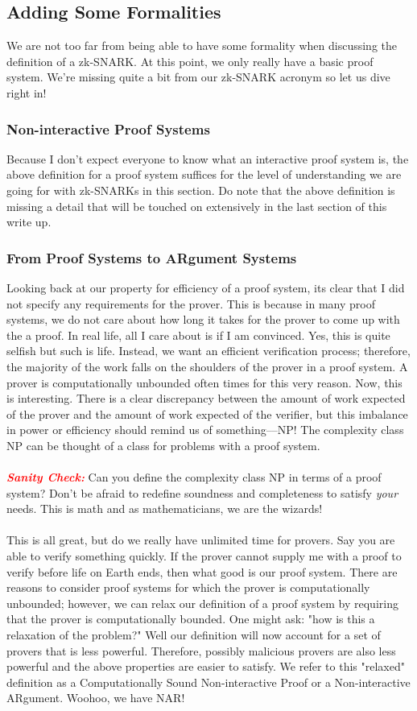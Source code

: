 \documentclass{article}
\begin{document}
\subsection{Adding Some Formalities}
We are not too far from being able to have some formality when discussing the definition of a zk-SNARK. At this point, we only really have a basic proof system. We're missing quite a bit from our zk-SNARK acronym so let us dive right in!
\subsubsection{Non-interactive Proof Systems}
Because I don't expect everyone to know what an interactive proof system is, the above definition for a proof system suffices for the level of understanding we are going for with zk-SNARKs in this section. Do note that the above definition is missing a detail that will be touched on extensively in the last section of this write up.
\subsubsection{From Proof Systems to ARgument Systems}
Looking back at our property for efficiency of a proof system, its clear that I did not specify any requirements for the prover. This is because in many proof systems, we do not care about how long it takes for the prover to come up with the a proof. In real life, all I care about is if I am convinced. Yes, this is quite selfish but such is life. Instead, we want an efficient verification process; therefore, the majority of the work falls on the shoulders of the prover in a proof system. A prover is computationally unbounded often times for this very reason. Now, this is interesting. There is a clear discrepancy between the amount of work expected of the prover and the amount of work expected of the verifier, but this imbalance in power or efficiency should remind us of something––\textsc{NP}! The complexity class \textsc{NP} can be thought of a class for problems with a proof system. \\ \\
\noindent \textbf{\textit{\textcolor{red}{Sanity Check:}}} Can you define the complexity class \textsc{NP} in terms of a proof system? Don't be afraid to redefine soundness and completeness to satisfy \textit{your} needs. This is math and as mathematicians, we are the wizards! \\ \\
\noindent This is all great, but do we really have unlimited time for provers. Say you are able to verify something quickly. If the prover cannot supply me with a proof to verify before life on Earth ends, then what good is our proof system. There are reasons to consider proof systems for which the prover is computationally unbounded; however, we can relax our definition of a proof system by requiring that the prover is computationally bounded. One might ask: "how is this a relaxation of the problem?" Well our definition will now account for a set of provers that is less powerful. Therefore, possibly malicious provers are also less powerful and the above properties are easier to satisfy. We refer to this "relaxed" definition as a Computationally Sound Non-interactive Proof or a Non-interactive ARgument. Woohoo, we have NAR!
\end{document}

